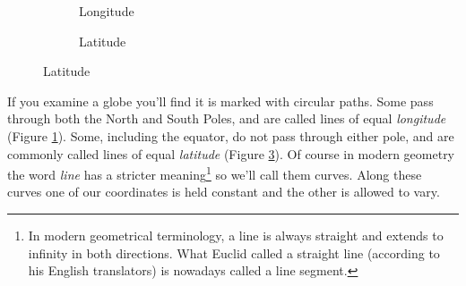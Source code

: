 \begin{figure}[h]
\begin{subfigure}{0.5\textwidth}
\begin{tikzpicture}[tdplot_main_coords, scale = 2]
        \end{tikzpicture}
        \caption{Longitude} \label{fig:globe-longitude}
    \end{subfigure}
    \begin{subfigure}{0.5\textwidth}
        \centering
    \caption{Latitude} \label{fig:globe-latitude}
    \end{subfigure}
\end{figure}

If you examine a globe you'll find it is marked with circular paths. Some pass through both the North and South Poles, and are called lines of equal \textit{longitude} (Figure \ref{fig:globe-longitude}). Some, including the equator, do not pass through either pole, and are commonly called lines of equal \textit{latitude} (Figure \ref{fig:globe-latitude}). Of course in modern geometry the word \textit{line} has a stricter meaning\footnote{In modern geometrical terminology, a line is always straight and extends to infinity in both directions. What Euclid called a straight line (according to his English translators) is nowadays called a line segment.} so we'll call them curves. Along these curves one of our coordinates is held constant and the other is allowed to vary.

